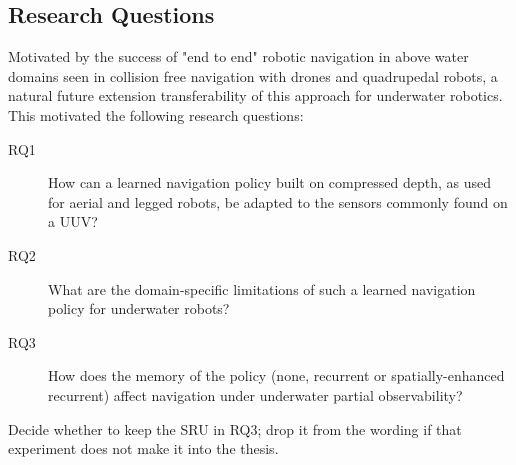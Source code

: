 \subsection{Research Questions}
\label{sec:rq}
Motivated by the success of "end to end" robotic navigation in above water domains seen in collision free navigation with drones and quadrupedal robots, a natural future extension transferability of this approach for underwater robotics. This motivated the following research questions:
\begin{description}
    \item[RQ1] How can a learned navigation policy built on compressed depth, as used for aerial and legged robots, be adapted to the sensors commonly found on a UUV?
    \item[RQ2] What are the domain-specific limitations of such a learned navigation policy for underwater robots?
    \item[RQ3] How does the memory of the policy (none, recurrent or spatially-enhanced recurrent) affect navigation under underwater partial observability?
\end{description}
\begin{todolist}
  \item Decide whether to keep the SRU in RQ3; drop it from the wording if that experiment does not make it into the thesis.
\end{todolist}

